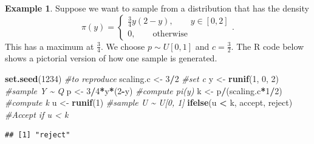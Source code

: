 \documentclass[
]{book}
\newenvironment{Shaded}{\begin{snugshade}}{\end{snugshade}}
\newcommand{\CommentTok}[1]{\textcolor[rgb]{0.56,0.35,0.01}{\textit{#1}}}
\newcommand{\DecValTok}[1]{\textcolor[rgb]{0.00,0.00,0.81}{#1}}
\newcommand{\FunctionTok}[1]{\textcolor[rgb]{0.13,0.29,0.53}{\textbf{#1}}}
\newcommand{\NormalTok}[1]{#1}
\newcommand{\OtherTok}[1]{\textcolor[rgb]{0.56,0.35,0.01}{#1}}
\newcommand{\SpecialCharTok}[1]{\textcolor[rgb]{0.81,0.36,0.00}{\textbf{#1}}}
\newcommand{\StringTok}[1]{\textcolor[rgb]{0.31,0.60,0.02}{#1}}
\theoremstyle{definition}
\theoremstyle{definition}
\newtheorem{example}{Example}[chapter]
\theoremstyle{definition}
\theoremstyle{definition}
\theoremstyle{remark}
\begin{document}
\begin{example}
Suppose we want to sample from a distribution that has the density
\[
\pi(y) = \begin{cases}
\frac{3}{4}y(2-y), \qquad y \in [0, 2] \\
0, \qquad \textrm{otherwise}
\end{cases}.
\]
This has a maximum at \(\frac{3}{4}\). We choose \(p \sim U[0, 1]\) and \(c = \frac{3}{2}\). The R code below shows a pictorial version of how one sample is generated.

\begin{Shaded}
\begin{Highlighting}[]
\FunctionTok{set.seed}\NormalTok{(}\DecValTok{1234}\NormalTok{)   }\CommentTok{\#to reproduce}
\NormalTok{scaling.c }\OtherTok{\textless{}{-}} \DecValTok{3}\SpecialCharTok{/}\DecValTok{2}         \CommentTok{\#set c}
\NormalTok{y }\OtherTok{\textless{}{-}} \FunctionTok{runif}\NormalTok{(}\DecValTok{1}\NormalTok{, }\DecValTok{0}\NormalTok{, }\DecValTok{2}\NormalTok{)    }\CommentTok{\#sample Y \textasciitilde{} Q}
\NormalTok{p }\OtherTok{\textless{}{-}} \DecValTok{3}\SpecialCharTok{/}\DecValTok{4}\SpecialCharTok{*}\NormalTok{y}\SpecialCharTok{*}\NormalTok{(}\DecValTok{2}\SpecialCharTok{{-}}\NormalTok{y) }\CommentTok{\#compute pi(y)}
\NormalTok{k }\OtherTok{\textless{}{-}}\NormalTok{ p}\SpecialCharTok{/}\NormalTok{(scaling.c}\SpecialCharTok{*}\DecValTok{1}\SpecialCharTok{/}\DecValTok{2}\NormalTok{)     }\CommentTok{\#compute k}
\NormalTok{u }\OtherTok{\textless{}{-}} \FunctionTok{runif}\NormalTok{(}\DecValTok{1}\NormalTok{)    }\CommentTok{\#sample U \textasciitilde{} U[0, 1]}
\FunctionTok{ifelse}\NormalTok{(u }\SpecialCharTok{\textless{}}\NormalTok{ k, }\StringTok{\textquotesingle{}accept\textquotesingle{}}\NormalTok{, }\StringTok{\textquotesingle{}reject\textquotesingle{}}\NormalTok{) }\CommentTok{\#Accept if  u \textless{} k}
\end{Highlighting}
\end{Shaded}

\begin{verbatim}
## [1] "reject"
\end{verbatim}


\end{example}
\end{document}
